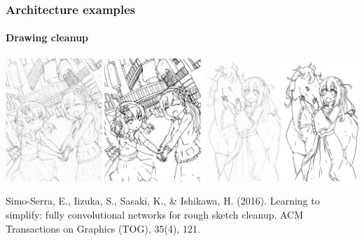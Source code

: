 \documentclass[9pt]{beamer}
\begin{document}
\begin{frame}
  \frametitle{Architecture examples}

  \framesubtitle{Drawing cleanup}

  \begin{center}
    \includegraphics[width = \linewidth]{images/drawing_simplification_example.png}
  \end{center}

  \bigskip

  {\footnotesize Simo-Serra, E., Iizuka, S., Sasaki, K., \& Ishikawa,
    H. (2016). Learning to simplify: fully convolutional networks for
    rough sketch cleanup. ACM Transactions on Graphics (TOG), 35(4),
    121.}
\end{frame}







\end{document}
